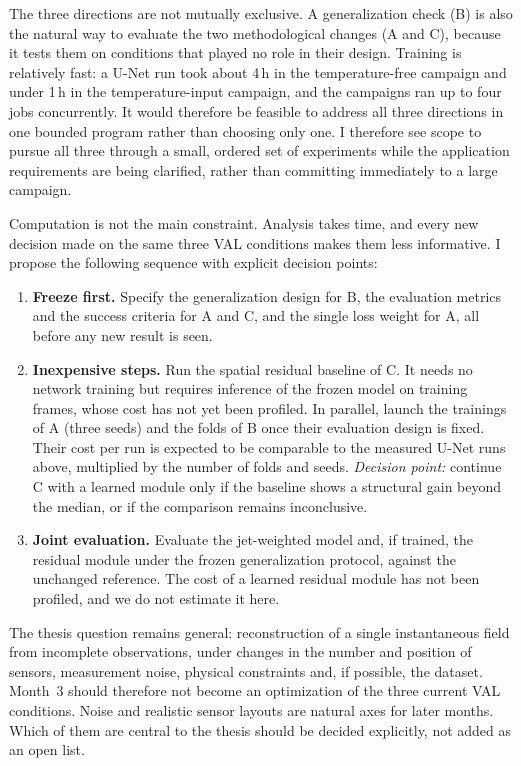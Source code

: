 \documentclass[11pt,letterpaper]{article}
\begin{document}
The three directions are not mutually exclusive. A generalization check (B) is also the natural way to evaluate the two methodological changes (A and C), because it tests them on conditions that played no role in their design. Training is relatively fast: a U-Net run took about 4\,h in the temperature-free campaign and under 1\,h in the temperature-input campaign, and the campaigns ran up to four jobs concurrently. It would therefore be feasible to address all three directions in one bounded program rather than choosing only one. I therefore see scope to pursue all three through a small, ordered set of experiments while the application requirements are being clarified, rather than committing immediately to a large campaign.

Computation is not the main constraint. Analysis takes time, and every new decision made on the same three VAL conditions makes them less informative. I propose the following sequence with explicit decision points:
\begin{enumerate}
  \item \textbf{Freeze first.} Specify the generalization design for B, the evaluation metrics and the success criteria for A and C, and the single loss weight for A, all before any new result is seen.
  \item \textbf{Inexpensive steps.} Run the spatial residual baseline of C. It needs no network training but requires inference of the frozen model on training frames, whose cost has not yet been profiled. In parallel, launch the trainings of A (three seeds) and the folds of B once their evaluation design is fixed. Their cost per run is expected to be comparable to the measured U-Net runs above, multiplied by the number of folds and seeds. \emph{Decision point:} continue C with a learned module only if the baseline shows a structural gain beyond the median, or if the comparison remains inconclusive.
  \item \textbf{Joint evaluation.} Evaluate the jet-weighted model and, if trained, the residual module under the frozen generalization protocol, against the unchanged reference. The cost of a learned residual module has not been profiled, and we do not estimate it here.
\end{enumerate}

The thesis question remains general: reconstruction of a single instantaneous field from incomplete observations, under changes in the number and position of sensors, measurement noise, physical constraints and, if possible, the dataset. Month~3 should therefore not become an optimization of the three current VAL conditions. Noise and realistic sensor layouts are natural axes for later months. Which of them are central to the thesis should be decided explicitly, not added as an open list.
\end{document}
